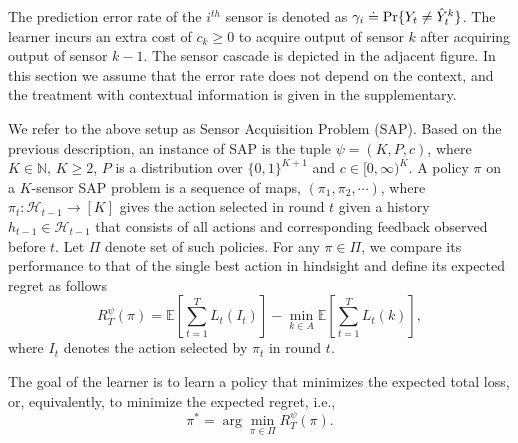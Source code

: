 The prediction error rate of the $i^{th}$ sensor is denoted as $\gamma_i\doteq\Pr\{Y_t\neq \hat{Y}^k_t\}$. The learner incurs an extra cost of $c_k\geq 0$ to acquire output of sensor $k$ after acquiring output of sensor $k-1$. The sensor cascade is depicted in the adjacent figure. In this section we assume that the error rate does not depend on the  context, and the treatment with contextual information is given in the supplementary. 
\fi

We refer to the above setup as Sensor Acquisition Problem (SAP).
Based on the previous description, an instance of SAP is the tuple $\psi = (K,P,c)$, where $K\in \mathbb{N}$, $K\ge 2$,
$P$ is a distribution over $\{0,1\}^{K+1}$ and $c\in [0,\infty)^K$. 
 A policy $\pi$ on a $K$-sensor SAP problem
 is a sequence of maps, $(\pi_1, \pi_2, \cdots)$, where
 $\pi_t : \mathcal{H}_{t-1}\rightarrow [K]$ gives the action selected in round $t$
 given a history $h_{t-1}\in \mathcal{H}_{t-1}$ that consists of all actions and corresponding feedback observed before $t$. 
 Let $\Pi$ denote set of such policies. 
 For any $\pi \in \Pi$, we compare its performance to that of the single best action in hindsight 
 and define its expected regret as follows
\begin{equation}
R^\psi_T(\pi)= \mathbb{E}\left[\sum_{t=1}^T L_t(I_t)\right]-\min_{k\in A}\mathbb{E}\left[\sum_{t=1}^T L_t(k)\right],
\end{equation}
where $I_t$ denotes the action selected by $\pi_t$ in round $t$.

The goal of the learner is to learn a policy that minimizes the expected total loss, or, equivalently, to minimize the expected regret, i.e.,
\begin{equation}
\pi^*= \arg \min_{\pi \in \Pi } R^\psi_T(\pi).
\end{equation}

